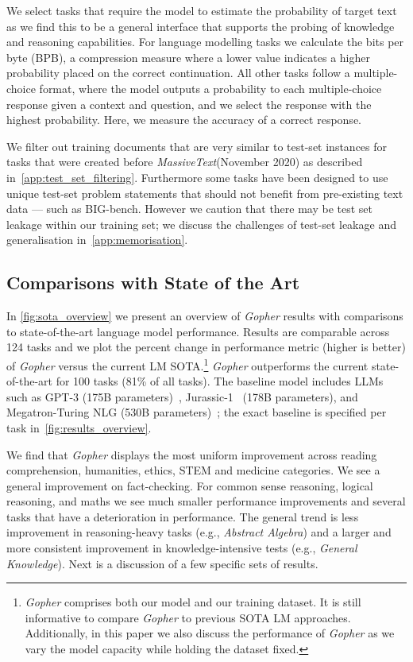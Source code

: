 \documentclass[11pt, a4paper, logo, internal, copyright, nonumbering]{deepmind}
\newcommand{\massivetext}{\textit{MassiveText}\xspace}
\newcommand{\gopher}{\textit{Gopher}\xspace}
\newcommand{\bigbench}{BIG-bench\xspace}
\begin{document}
We select tasks that require the model to estimate the probability of target text as we find this to be a general interface that supports the probing of knowledge and reasoning capabilities.
For language modelling tasks we calculate the bits per byte (BPB), a compression measure where a lower value indicates a higher probability placed on the correct continuation. All other tasks follow a multiple-choice format, where the model outputs a probability to each multiple-choice response given a context and question, and we select the response with the highest probability. Here, we measure the accuracy of a correct response.   

We filter out training documents that are very similar to test-set instances for tasks that were created before \massivetext (November 2020) as described in~\autoref{app:test_set_filtering}. Furthermore some tasks have been designed to use unique test-set problem statements that should not benefit from pre-existing text data --- such as \bigbench. However we caution that there may be test set leakage within our training set; we discuss the challenges of test-set leakage and generalisation in~\autoref{app:memorisation}.

\subsection{Comparisons with State of the Art}

In \autoref{fig:sota_overview} we present an overview of \gopher results with comparisons to state-of-the-art language model performance. Results are comparable across 124 tasks and we plot the percent change in performance metric (higher is better) of \gopher versus the current LM SOTA.\footnote{\gopher comprises both our model and our training dataset. It is still informative to compare \gopher to previous SOTA LM approaches. Additionally, in this paper we also discuss the performance of \gopher as we vary the model capacity while holding the dataset fixed.}
\gopher outperforms the current state-of-the-art for 100 tasks (81\% of all tasks). The baseline model includes LLMs such as GPT-3 (175B parameters)~\citep{gpt3}, Jurassic-1~\citep{jurassic} (178B parameters), and Megatron-Turing NLG (530B parameters)~\citep{Megatron-Turing}; the exact baseline is specified per task in~\autoref{fig:results_overview}. 

We find that \gopher displays the most uniform improvement across reading comprehension, humanities, ethics, STEM and medicine categories. We see a general improvement on fact-checking.
For common sense reasoning, logical reasoning, and maths we see much smaller performance improvements and several tasks that have a deterioration in performance. 
The general trend is less improvement in reasoning-heavy tasks (e.g., \textit{Abstract Algebra}) and a larger and more consistent improvement in knowledge-intensive tests (e.g., \textit{General Knowledge}).
Next is a discussion of a few specific sets of results.
\end{document}
